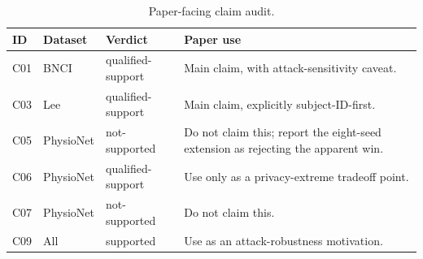 \begin{table}[t]
\centering
\caption{Paper-facing claim audit.}
\label{tab:claims-audit}
\begin{tabular}{llll}
\toprule
ID & Dataset & Verdict & Paper use \\
\midrule
C01 & BNCI & qualified-support & Main claim, with attack-sensitivity caveat. \\
C03 & Lee & qualified-support & Main claim, explicitly subject-ID-first. \\
C05 & PhysioNet & not-supported & Do not claim this; report the eight-seed extension as rejecting the apparent win. \\
C06 & PhysioNet & qualified-support & Use only as a privacy-extreme tradeoff point. \\
C07 & PhysioNet & not-supported & Do not claim this. \\
C09 & All & supported & Use as an attack-robustness motivation. \\
\bottomrule
\end{tabular}
\end{table}
